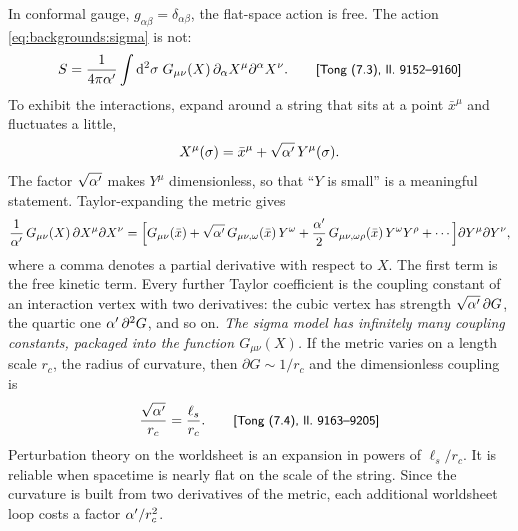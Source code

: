 In conformal gauge, $g_{\alpha\beta}=\delta_{\alpha\beta}$, the flat-space action is free.
The action \eqref{eq:backgrounds:sigma} is not:
\begin{equation}\label{eq:backgrounds:gauge}
  S=\frac{1}{4\pi\alpha'}\int\mathrm{d}^2\sigma\;G_{\mu\nu}(X)\,\partial_\alpha X^\mu\partial^\alpha X^\nu .
  \qquad\text{{\small\textsf{[Tong (7.3), ll.~9152--9160]}}}
\end{equation}
To exhibit the interactions, expand around a string that sits at a point $\bar x^\mu$ and
fluctuates a little,
\begin{equation}\label{eq:backgrounds:Y}
  X^\mu(\sigma)=\bar x^\mu+\sqrt{\alpha'}\,Y^\mu(\sigma).
\end{equation}
The factor $\sqrt{\alpha'}$ makes $Y^\mu$ dimensionless, so that ``$Y$ is small'' is a meaningful
statement. Taylor-expanding the metric gives
\begin{equation}\label{eq:backgrounds:taylor}
  \frac{1}{\alpha'}\,G_{\mu\nu}(X)\,\partial X^\mu\partial X^\nu
  =\Bigl[G_{\mu\nu}(\bar x)+\sqrt{\alpha'}\,G_{\mu\nu,\omega}(\bar x)\,Y^\omega
  +\frac{\alpha'}{2}\,G_{\mu\nu,\omega\rho}(\bar x)\,Y^\omega Y^\rho+\cdots\Bigr]
  \partial Y^\mu\partial Y^\nu ,
\end{equation}
where a comma denotes a partial derivative with respect to $X$. The first term is the free
kinetic term. Every further Taylor coefficient is the coupling constant of an interaction
vertex with two derivatives: the cubic vertex has strength
$\sqrt{\alpha'}\,\partial G$, the quartic one $\alpha'\,\partial^2G$, and so on. \emph{The
sigma model has infinitely many coupling constants, packaged into the function
$G_{\mu\nu}(X)$.} If the metric varies on a length scale $r_c$, the radius of curvature, then
$\partial G\sim1/r_c$ and the dimensionless coupling is
\begin{equation}\label{eq:backgrounds:coupling}
  \frac{\sqrt{\alpha'}}{r_c}=\frac{\ell_s}{r_c}.
  \qquad\text{{\small\textsf{[Tong (7.4), ll.~9163--9205]}}}
\end{equation}
%
Perturbation theory on the worldsheet is an expansion in powers of $\ell_s/r_c$. It is
reliable when spacetime is nearly flat on the scale of the string. Since the curvature is
built from two derivatives of the metric, each additional worldsheet loop costs a factor
$\alpha'/r_c^2$.

